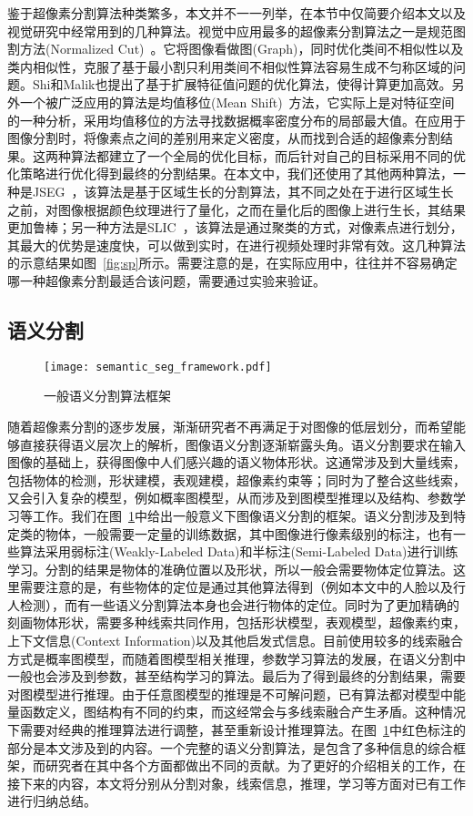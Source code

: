 鉴于超像素分割算法种类繁多，本文并不一一列举，在本节中仅简要介绍本文以及视觉研究中经常用到的几种算法。视觉中应用最多的超像素分割算法之一是规范图割方法(Normalized Cut)~\cite{ncut}。它将图像看做图(Graph)，同时优化类间不相似性以及类内相似性，克服了基于最小割只利用类间不相似性算法容易生成不匀称区域的问题。Shi和Malik也提出了基于扩展特征值问题的优化算法，使得计算更加高效。另外一个被广泛应用的算法是均值移位(Mean Shift)~\cite{meanshift}方法，它实际上是对特征空间的一种分析，采用均值移位的方法寻找数据概率密度分布的局部最大值。在应用于图像分割时，将像素点之间的差别用来定义密度，从而找到合适的超像素分割结果。这两种算法都建立了一个全局的优化目标，而后针对自己的目标采用不同的优化策略进行优化得到最终的分割结果。在本文中，我们还使用了其他两种算法，一种是JSEG~\cite{jseg}，该算法是基于区域生长的分割算法，其不同之处在于进行区域生长之前，对图像根据颜色纹理进行了量化，之而在量化后的图像上进行生长，其结果更加鲁棒；另一种方法是SLIC~\cite{slic}，该算法是通过聚类的方式，对像素点进行划分，其最大的优势是速度快，可以做到实时，在进行视频处理时非常有效。这几种算法的示意结果如图~\ref{fig:sp}所示。需要注意的是，在实际应用中，往往并不容易确定哪一种超像素分割最适合该问题，需要通过实验来验证。

\subsection{语义分割}
\begin{figure}[H]
  \centering
  \texttt{[image: semantic\_seg\_framework.pdf]}
  \caption{一般语义分割算法框架}
  \label{fig:semantic_seg_framework}
\end{figure}

随着超像素分割的逐步发展，渐渐研究者不再满足于对图像的低层划分，而希望能够直接获得语义层次上的解析，图像语义分割逐渐崭露头角。语义分割要求在输入图像的基础上，获得图像中人们感兴趣的语义物体形状。这通常涉及到大量线索，包括物体的检测，形状建模，表观建模，超像素约束等；同时为了整合这些线索，又会引入复杂的模型，例如概率图模型，从而涉及到图模型推理以及结构、参数学习等工作。我们在图~\ref{fig:semantic_seg_framework}中给出一般意义下图像语义分割的框架。语义分割涉及到特定类的物体，一般需要一定量的训练数据，其中图像进行像素级别的标注，也有一些算法采用弱标注(Weakly-Labeled Data)和半标注(Semi-Labeled Data)进行训练学习。分割的结果是物体的准确位置以及形状，所以一般会需要物体定位算法。这里需要注意的是，有些物体的定位是通过其他算法得到（例如本文中的人脸以及行人检测），而有一些语义分割算法本身也会进行物体的定位。同时为了更加精确的刻画物体形状，需要多种线索共同作用，包括形状模型，表观模型，超像素约束，上下文信息(Context Information)以及其他启发式信息。目前使用较多的线索融合方式是概率图模型，而随着图模型相关推理，参数学习算法的发展，在语义分割中一般也会涉及到参数，甚至结构学习的算法。最后为了得到最终的分割结果，需要对图模型进行推理。由于任意图模型的推理是不可解问题，已有算法都对模型中能量函数定义，图结构有不同的约束，而这经常会与多线索融合产生矛盾。这种情况下需要对经典的推理算法进行调整，甚至重新设计推理算法。在图~\ref{fig:semantic_seg_framework}中红色标注的部分是本文涉及到的内容。一个完整的语义分割算法，是包含了多种信息的综合框架，而研究者在其中各个方面都做出不同的贡献。为了更好的介绍相关的工作，在接下来的内容，本文将分别从分割对象，线索信息，推理，学习等方面对已有工作进行归纳总结。

